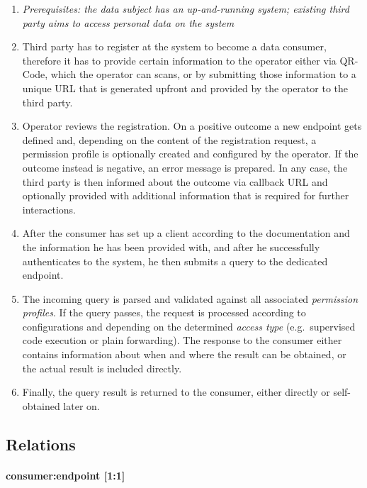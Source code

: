 \documentclass[12pt,english,a4paper,titlepage,cleardoublepage=empty,dottedtoc]{report}
\begin{document}
\begin{enumerate}
\def\labelenumi{\arabic{enumi}.}
\setcounter{enumi}{-1}
\item
  \emph{Prerequisites: the data subject has an up-and-running system;
  existing third party aims to access personal data on the system}
\item
  Third party has to register at the system to become a data consumer,
  therefore it has to provide certain information to the operator either
  via QR-Code, which the operator can scans, or by submitting those
  information to a unique URL that is generated upfront and provided by
  the operator to the third party.
\item
  Operator reviews the registration. On a positive outcome a new
  endpoint gets defined and, depending on the content of the
  registration request, a permission profile is optionally created and
  configured by the operator. If the outcome instead is negative, an
  error message is prepared. In any case, the third party is then
  informed about the outcome via callback URL and optionally provided
  with additional information that is required for further interactions.
\item
  After the consumer has set up a client according to the documentation
  and the information he has been provided with, and after he
  successfully authenticates to the system, he then submits a query to
  the dedicated endpoint.
\item
  The incoming query is parsed and validated against all associated
  \emph{permission profiles}. If the query passes, the request is
  processed according to configurations and depending on the determined
  \emph{access type} (e.g.~supervised code execution or plain
  forwarding). The response to the consumer either contains information
  about when and where the result can be obtained, or the actual result
  is included directly.
\item
  Finally, the query result is returned to the consumer, either directly
  or self-obtained later on.
\end{enumerate}

\subsection{Relations}\label{relations}

\paragraph{consumer:endpoint {[}1:1{]}}\label{consumerendpoint-11}
\end{document}
